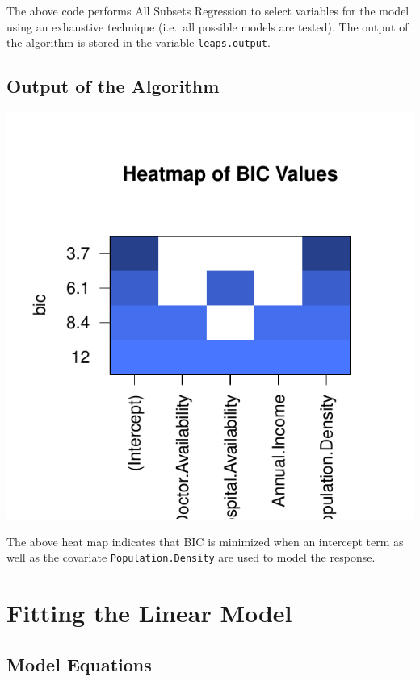 \documentclass[12pt,]{article}
\begin{document}
The above code performs All Subsets Regression to select variables for
the model using an exhaustive technique (i.e.~all possible models are
tested). The output of the algorithm is stored in the variable
\texttt{leaps.output}.

\subsection{Output of the Algorithm}\label{output-of-the-algorithm}

\begin{center}\includegraphics{report_files/figure-latex/bic_all_ss-1} \end{center}

The above heat map indicates that BIC is minimized when an intercept
term as well as the covariate \texttt{Population.Density} are used to
model the response.

\section{Fitting the Linear Model}\label{fitting-the-linear-model}

\subsection{Model Equations}\label{model-equations}
\end{document}
